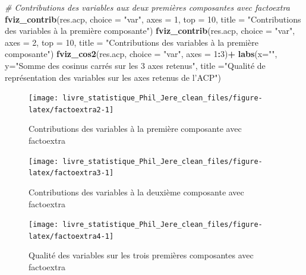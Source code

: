 \documentclass[
  11pt,
  french,
]{book}
\makeatletter
\newenvironment{Shaded}{\begin{snugshade}}{\end{snugshade}}
\newcommand{\CommentTok}[1]{\textcolor[rgb]{0.56,0.35,0.01}{\textit{#1}}}
\newcommand{\DataTypeTok}[1]{\textcolor[rgb]{0.13,0.29,0.53}{#1}}
\newcommand{\DecValTok}[1]{\textcolor[rgb]{0.00,0.00,0.81}{#1}}
\newcommand{\KeywordTok}[1]{\textcolor[rgb]{0.13,0.29,0.53}{\textbf{#1}}}
\newcommand{\NormalTok}[1]{#1}
\newcommand{\OperatorTok}[1]{\textcolor[rgb]{0.81,0.36,0.00}{\textbf{#1}}}
\newcommand{\StringTok}[1]{\textcolor[rgb]{0.31,0.60,0.02}{#1}}
\newenvironment{kframe}{%
\medskip{}
\setlength{\fboxsep}{.8em}
 \def\at@end@of@kframe{}%
 \ifinner\ifhmode%
  \def\at@end@of@kframe{\end{minipage}}%
  \begin{minipage}{\columnwidth}%
 \fi\fi%
 \def\FrameCommand##1{\hskip\@totalleftmargin \hskip-\fboxsep
 \colorbox{shadecolor}{##1}\hskip-\fboxsep
     \hskip-\linewidth \hskip-\@totalleftmargin \hskip\columnwidth}%
 \MakeFramed {\advance\hsize-\width
   \@totalleftmargin\z@ \linewidth\hsize
   \@setminipage}}%
 {\par\unskip\endMakeFramed%
 \at@end@of@kframe}
\renewenvironment{Shaded}{\begin{kframe}}{\end{kframe}}
\makeatother
\begin{document}
\begin{Shaded}
\begin{Highlighting}[]
\CommentTok{# Contributions des variables aux deux premières composantes avec factoextra}
\KeywordTok{fviz_contrib}\NormalTok{(res.acp, }\DataTypeTok{choice =} \StringTok{"var"}\NormalTok{, }\DataTypeTok{axes =} \DecValTok{1}\NormalTok{, }\DataTypeTok{top =} \DecValTok{10}\NormalTok{,}
             \DataTypeTok{title =} \StringTok{"Contributions des variables à la première composante"}\NormalTok{)}
\KeywordTok{fviz_contrib}\NormalTok{(res.acp, }\DataTypeTok{choice =} \StringTok{"var"}\NormalTok{, }\DataTypeTok{axes =} \DecValTok{2}\NormalTok{, }\DataTypeTok{top =} \DecValTok{10}\NormalTok{,}
             \DataTypeTok{title =} \StringTok{"Contributions des variables à la première composante"}\NormalTok{)}
\KeywordTok{fviz_cos2}\NormalTok{(res.acp, }\DataTypeTok{choice =} \StringTok{"var"}\NormalTok{, }\DataTypeTok{axes =} \DecValTok{1}\OperatorTok{:}\DecValTok{3}\NormalTok{)}\OperatorTok{+}
\StringTok{  }\KeywordTok{labs}\NormalTok{(}\DataTypeTok{x=}\StringTok{""}\NormalTok{, }\DataTypeTok{y=}\StringTok{"Somme des cosinus carrés sur les 3 axes retenus"}\NormalTok{,}
       \DataTypeTok{title =}\StringTok{"Qualité de représentation des variables sur les axes retenus de l'ACP"}\NormalTok{)}
\end{Highlighting}
\end{Shaded}

\begin{figure}

{\centering \texttt{[image: livre\_statistique\_Phil\_Jere\_clean\_files/figure-latex/factoextra2-1]} 

}

\caption{Contributions des variables à la première composante avec factoextra}\label{fig:factoextra2}
\end{figure}

\begin{figure}

{\centering \texttt{[image: livre\_statistique\_Phil\_Jere\_clean\_files/figure-latex/factoextra3-1]} 

}

\caption{Contributions des variables à la deuxième composante avec factoextra}\label{fig:factoextra3}
\end{figure}

\begin{figure}

{\centering \texttt{[image: livre\_statistique\_Phil\_Jere\_clean\_files/figure-latex/factoextra4-1]} 

}

\caption{Qualité des variables sur les trois premières composantes avec factoextra}\label{fig:factoextra4}
\end{figure}
\end{document}
